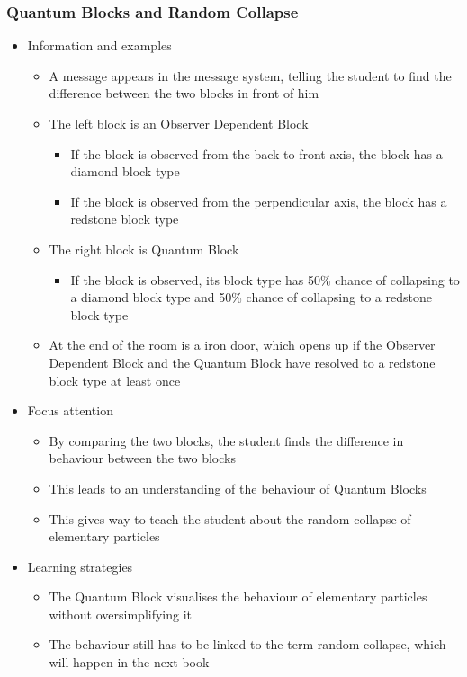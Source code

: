 \documentclass[11pt,twoside]{report} %
\begin{document}
\subsubsection{Quantum Blocks and Random Collapse}
	\begin{itemize}
		\item Information and examples
		\begin{itemize}
			\item A message appears in the message system, telling the student to find the difference between the two blocks in front of him
			\item The left block is an Observer Dependent Block
			\begin{itemize}
				\item If the block is observed from the back-to-front axis, the block has a diamond block type
				\item If the block is observed from the perpendicular axis, the block has a redstone block type
			\end{itemize}
			\item The right block is Quantum Block
			\begin{itemize}
				\item If the block is observed, its block type has 50\% chance of collapsing to a diamond block type and 50\% chance of collapsing to a redstone block type
			\end{itemize}
			\item At the end of the room is a iron door, which opens up if the Observer Dependent Block and the Quantum Block have resolved to a redstone block type at least once
		\end{itemize}
		\item Focus attention
		\begin{itemize}
			\item By comparing the two blocks, the student finds the difference in behaviour between the two blocks
			\item This leads to an understanding of the behaviour of Quantum Blocks
			\item This gives way to teach the student about the random collapse of elementary particles
		\end{itemize}
		\item Learning strategies
		\begin{itemize}
			\item The Quantum Block visualises the behaviour of elementary particles without oversimplifying it
			\item The behaviour still has to be linked to the term random collapse, which will happen in the next book

\end{itemize}
\end{itemize}
\end{document}
